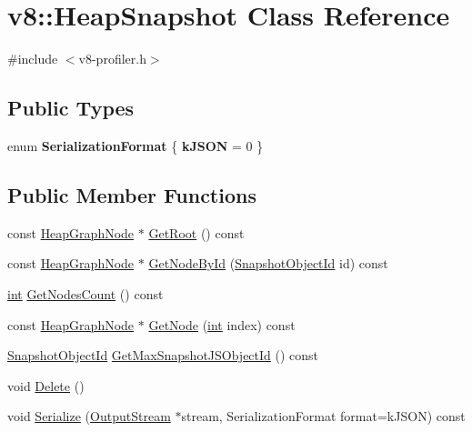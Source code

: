 \hypertarget{classv8_1_1HeapSnapshot}{}\section{v8\+:\+:Heap\+Snapshot Class Reference}
\label{classv8_1_1HeapSnapshot}


{\ttfamily \#include $<$v8-\/profiler.\+h$>$}

\subsection*{Public Types}
\begin{DoxyCompactItemize}
\item 
\mbox{\label{classv8_1_1HeapSnapshot_a8ed7909568af85f7a36ef5f4da4dd495}} 
enum {\bfseries Serialization\+Format} \{ {\bfseries k\+J\+S\+ON} = 0
 \}
\end{DoxyCompactItemize}
\subsection*{Public Member Functions}
\begin{DoxyCompactItemize}
\item 
const \mbox{\hyperlink{classv8_1_1HeapGraphNode}{Heap\+Graph\+Node}} $\ast$ \mbox{\hyperlink{classv8_1_1HeapSnapshot_ab636eb9db043fed952d87d03525bcbd5}{Get\+Root}} () const
\item 
const \mbox{\hyperlink{classv8_1_1HeapGraphNode}{Heap\+Graph\+Node}} $\ast$ \mbox{\hyperlink{classv8_1_1HeapSnapshot_a17777c4ef00f142ef176b54f433e2d44}{Get\+Node\+By\+Id}} (\mbox{\hyperlink{classuint32__t}{Snapshot\+Object\+Id}} id) const
\item 
\mbox{\hyperlink{classint}{int}} \mbox{\hyperlink{classv8_1_1HeapSnapshot_a6878bb7eb14674e754fef18080153003}{Get\+Nodes\+Count}} () const
\item 
const \mbox{\hyperlink{classv8_1_1HeapGraphNode}{Heap\+Graph\+Node}} $\ast$ \mbox{\hyperlink{classv8_1_1HeapSnapshot_ac469912038b7f19fe71c2f73a18b10e4}{Get\+Node}} (\mbox{\hyperlink{classint}{int}} index) const
\item 
\mbox{\hyperlink{classuint32__t}{Snapshot\+Object\+Id}} \mbox{\hyperlink{classv8_1_1HeapSnapshot_ab85fc78102f4e7a3c4f2bf66a3665908}{Get\+Max\+Snapshot\+J\+S\+Object\+Id}} () const
\item 
void \mbox{\hyperlink{classv8_1_1HeapSnapshot_aeaa6073009e4041839dff7a860d2548a}{Delete}} ()
\item 
void \mbox{\hyperlink{classv8_1_1HeapSnapshot_ad2e9773fcdc6785e799400c39d9eeba1}{Serialize}} (\mbox{\hyperlink{classv8_1_1OutputStream}{Output\+Stream}} $\ast$stream, Serialization\+Format format=k\+J\+S\+ON) const
\end{DoxyCompactItemize}


